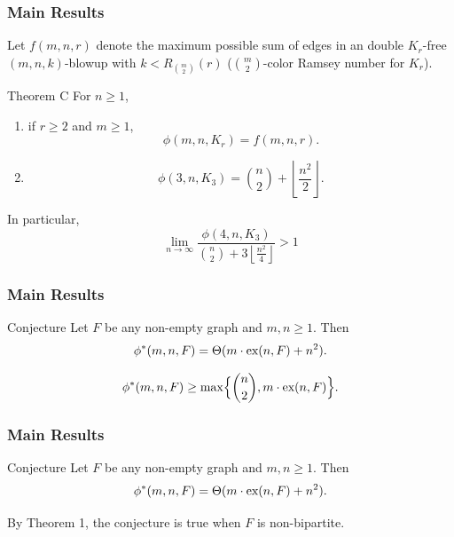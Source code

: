 \documentclass{beamer}
\newcommand*{\ex}{\textnormal{ex}}
\begin{document}
\begin{frame}

  \frametitle{Main Results}

  Let $f(m, n, r)$ denote the maximum possible sum of edges in an double $K_r$-free $(m, n, k)$-blowup with $k < R_{\binom{m}{2}}(r) $ ($\binom{m}{2}$-color Ramsey number for $K_r$).

  \pause

  \begin{block}{Theorem C}
    For $n \geq 1$,
    \begin{enumerate}
      \item if $r \geq 2$ and $m \geq 1$,
      \[
        \phi(m, n, K_r) = f(m, n, r).
      \]
      \item 
      \[
        \phi(3, n, K_3) = \binom{n}{2} + \left\lfloor \frac{n^2}{2} \right\rfloor.
      \]
    \end{enumerate}
    In particular,
    \[
      \lim_{n \to \infty} \frac{\phi(4, n, K_3)}{\binom{n}{2} + 3\left\lfloor \frac{n^2}{4} \right\rfloor} > 1
    \]
  \end{block}
\end{frame}

\begin{frame}
  \frametitle{Main Results}

  \begin{block}{Conjecture}
    Let $F$ be any non-empty graph and $m, n \geq 1$. Then
    \[ 
      \phi^*(m,n,F) = \Theta(m \cdot \ex(n,F) + n^2).
    \]
  \end{block}

  \pause

  \vspace{0.3cm}

  \[ 
    \phi^*(m,n,F) \geq \max\Bigl\{\binom{n}{2},m\cdot \ex(n,F)\Bigr\}.
  \]
\end{frame}

\begin{frame}
  \frametitle{Main Results}

  \begin{block}{Conjecture}
    Let $F$ be any non-empty graph and $m, n \geq 1$. Then
    \[ 
      \phi^*(m,n,F) = \Theta(m \cdot \ex(n,F) + n^2).
    \]
  \end{block}

  \vspace{0.5cm}

  By Theorem 1, the conjecture is true when $F$ is non-bipartite.
\end{frame}
\end{document}
